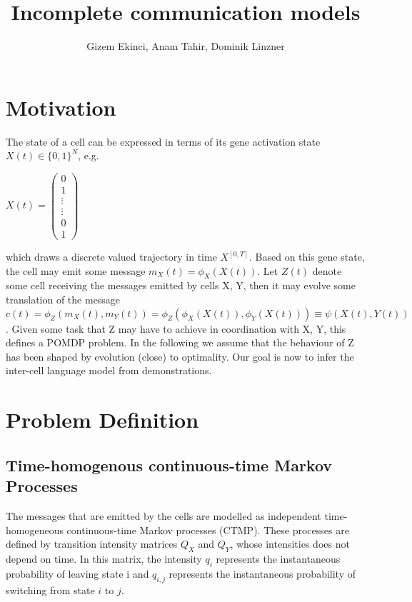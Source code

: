 \documentclass[]{article}
\title{Incomplete communication models}
\author{Gizem Ekinci, Anam Tahir, Dominik Linzner}
\begin{document}
\maketitle

\section{Motivation}

The state of a cell can be expressed in terms of its gene activation state $ X(t) \in \{0, 1\}^{N} $, e.g.
\begin{center}
\begin{math}
X(t)=\left(\begin{array}{c}
{0} \\
{1} \\
{\vdots} \\
{\vdots} \\
{0} \\
{1}
\end{array}\right)
\end{math}\\
\end{center}
which draws a discrete valued trajectory in time $ X^{[0,T]} $. Based on this gene state, the cell may emit some message $ m_{X}(t) = \phi_{X}(X(t)) $. Let $ Z(t) $ denote some cell receiving the messages emitted by cells X, Y, then it may evolve some translation of the message $ c(t) = \phi _{Z} (m_{X}(t),m_{Y}(t)) = \phi_{Z}(\phi_{X}(X(t)), \phi_{Y}(X(t))) \equiv \psi(X(t), Y(t)) $. Given some task that Z may have to achieve in coordination with X, Y, this defines a POMDP problem. In the following we assume that the behaviour of Z has been shaped by evolution (close) to optimality. Our goal is now to infer the inter-cell language model from demonstrations. \\

\section{Problem Definition}

\subsection{Time-homogenous continuous-time Markov Processes}
The messages that are emitted by the cells are modelled as independent time-homogeneous continuous-time Markov processes (CTMP). These processes are defined by transition intensity matrices $ Q_{X} $ and $ Q_{Y} $, whose intensities does not depend on time. In this matrix, the intensity $ q_{i} $ represents the instantaneous probability of leaving state i and $ q_{i,j} $ represents the instantaneous probability of switching from state $ i $ to $ j $.\\
\end{document}
